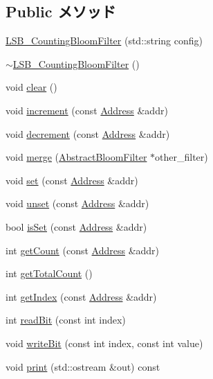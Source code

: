 \subsection*{Public メソッド}
\begin{DoxyCompactItemize}
\item 
\hyperlink{classLSB__CountingBloomFilter_a5259be133a6285e824ecb2711f244585}{LSB\_\-CountingBloomFilter} (std::string config)
\item 
\hyperlink{classLSB__CountingBloomFilter_a4f3340bf8dedccdde15063673cb6d70b}{$\sim$LSB\_\-CountingBloomFilter} ()
\item 
void \hyperlink{classLSB__CountingBloomFilter_ac8bb3912a3ce86b15842e79d0b421204}{clear} ()
\item 
void \hyperlink{classLSB__CountingBloomFilter_a3e860ad851b771ac3b6eeb1716eb56bc}{increment} (const \hyperlink{classAddress}{Address} \&addr)
\item 
void \hyperlink{classLSB__CountingBloomFilter_addb6b805abb8328082a24926f2bf8c84}{decrement} (const \hyperlink{classAddress}{Address} \&addr)
\item 
void \hyperlink{classLSB__CountingBloomFilter_a4091f5f95de040d4e0ae5bd86817b13c}{merge} (\hyperlink{classAbstractBloomFilter}{AbstractBloomFilter} $\ast$other\_\-filter)
\item 
void \hyperlink{classLSB__CountingBloomFilter_a2b666fae2a5c2b98bc5cba8e1333bcc9}{set} (const \hyperlink{classAddress}{Address} \&addr)
\item 
void \hyperlink{classLSB__CountingBloomFilter_a69b772787ea61467af679e3aa5406b41}{unset} (const \hyperlink{classAddress}{Address} \&addr)
\item 
bool \hyperlink{classLSB__CountingBloomFilter_a4200ee289c3d941a4b209c4788f8087c}{isSet} (const \hyperlink{classAddress}{Address} \&addr)
\item 
int \hyperlink{classLSB__CountingBloomFilter_abb722634d5846105b673e9496df8d062}{getCount} (const \hyperlink{classAddress}{Address} \&addr)
\item 
int \hyperlink{classLSB__CountingBloomFilter_a97f66183ea41a7c123bab9dd5313a74a}{getTotalCount} ()
\item 
int \hyperlink{classLSB__CountingBloomFilter_a19f42f6f2fc3501021b768f0df8108b2}{getIndex} (const \hyperlink{classAddress}{Address} \&addr)
\item 
int \hyperlink{classLSB__CountingBloomFilter_a6f8a98d0f38a8d122d4cbf87323484eb}{readBit} (const int index)
\item 
void \hyperlink{classLSB__CountingBloomFilter_ac188318778d26b44f567c5b530598c16}{writeBit} (const int index, const int value)
\item 
void \hyperlink{classLSB__CountingBloomFilter_ac55fe386a101fbae38c716067c9966a0}{print} (std::ostream \&out) const 
\end{DoxyCompactItemize}

